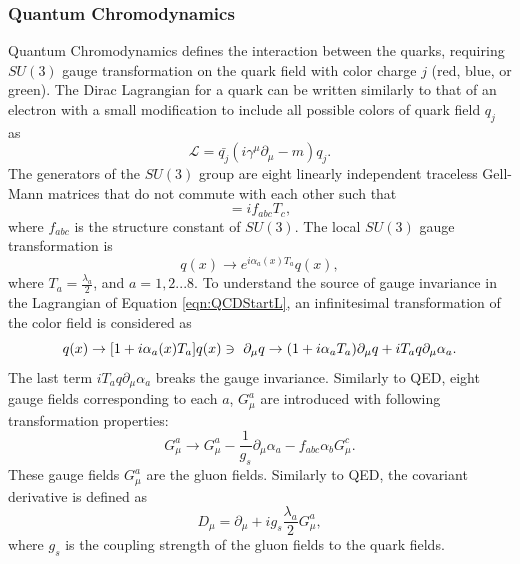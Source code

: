 \subsubsection{Quantum Chromodynamics }
\label{subsubsec:QCD}

Quantum Chromodynamics defines the interaction between the quarks, requiring $SU(3)$ gauge transformation on the quark field with color charge $j$ (red, blue, or green). The Dirac Lagrangian for a quark can be written similarly to that of an electron with a small modification to include all possible colors of quark field $q_{j}$ as
\begin{equation}
\mathcal{L} = \bar{q_{j}}(i\gamma^{\mu}\partial_{\mu} - m )q_{j}.
\label{eqn:QCDStartL}
\end{equation}
The generators of the $SU(3)$ group are eight linearly independent traceless Gell-Mann matrices that do not commute with each other such that 
\begin{equation}
[ T_{a},T_{b} ] = if_{abc}T_{c},
\label{eqn:SU3GellManMat}
\end{equation}
where $f_{abc}$ is the structure constant of $SU(3)$. The local $SU(3)$ gauge transformation is 
\begin{equation}
q(x) \rightarrow e^{i \alpha_a(x) T_{a}} q(x),
\label{eqn:QCDSU3LT}
\end{equation}
where $T_{a} = \frac{\lambda_{a}}{2}$, and $a = {1,2...8}$. To understand the source of gauge invariance in the Lagrangian of Equation \ref{eqn:QCDStartL}, an infinitesimal transformation of the color field is considered as
\begin{equation}
q(x) \rightarrow [ 1 + i\alpha_{a}(x)T_{a}]q(x) \\
\ni ~ \partial_{\mu}q \rightarrow ( 1 + i\alpha_{a}T_{a})\partial_{\mu}q + iT_{a}q\partial_{\mu} \alpha_{a}.
\end{equation}
The last term $iT_{a}q\partial_{\mu} \alpha_{a}$ breaks the gauge invariance. Similarly to QED, eight gauge fields corresponding to each $a$, $G_{\mu}^{a}$ are introduced with following transformation properties: 
\begin{equation}
G_{\mu}^{a} \rightarrow G_{\mu}^{a} - \frac{1}{g_{s}} \partial_{\mu} \alpha_{a} - f_{abc}\alpha_{b}G^{c}_{\mu}.
\label{eqn:SU3GaugeField}
\end{equation}
These gauge fields $G_{\mu}^{a}$ are the gluon fields. Similarly to QED, the covariant derivative is defined as
\begin{equation}
D_{\mu} = \partial_{\mu} + ig_{s}\frac{\lambda_{a}}{2}G_{\mu}^{a}, 
\label{eqn:SU3CovDerv}
\end{equation}
where $g_{s}$ is the coupling strength of the gluon fields to the quark fields.

